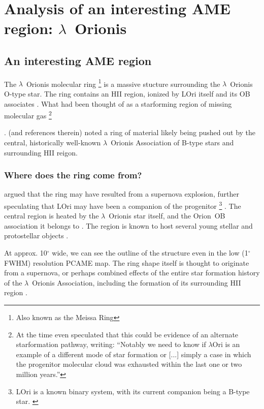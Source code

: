 \chapter{Analysis of an interesting AME region: $\lambda$~Orionis}

 \section{An interesting AME region}
		The $\lambda$~Orionis molecular ring \footnote{Also known as the Meissa Ring} is a massive stucture surrounding the $\lambda$~Orionis O-type star. The ring contains an HII region, ionized by LOri itself and its OB associates \citep{murdin77}. What had been thought of as a star\-forming region of missing molecular gas
    \footnote{At the time \cite{murdin77} even speculated that this could be evidence of an alternate star\-formation pathway, writing: ``Notably we need to know if $\lambda$Ori is an example of a different mode of star formation or [...] simply a case in which the progenitor molecular cloud was exhausted within the last one or two million years.''}

    \cite{maddalena86,maddalena87}.  (and references therein) noted a ring of material likely being pushed out by the central, historically well-known $\lambda$~Orionis Association of B-type stars and surrounding HII reigon.

   \subsection{Where does the ring come from?}
    \cite{cunha96} argued that the ring may have resulted from a supernova explosion, further speculating that LOri may have been a companion of the progenitor
    \footnote{LOri is a known binary system, with its current companion being a B-type star. \citep{murdin77}}
  .
     The central region is heated by the $\lambda$~Orionis star itself, and the Orion~OB association it belongs to \citep{ochsendorf15}. The region is known to host several young stellar and protostellar objects \citep{koenig15}.

    At approx. 10$^{\circ}$ wide, we can see the outline of the structure even in the low (1$^{\circ}$ FWHM) resolution PCAME map. The ring shape itself is thought to originate from a supernova, or perhaps combined effects of the entire star formation history of the $\lambda$~Orionis Association, including the formation of its surrounding HII region \citep{aran09}.

